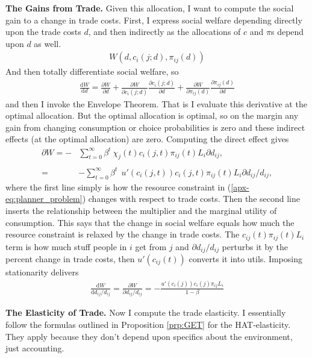 \documentclass[12pt,pdftex]{article}
\begin{document}
\begin{onehalfspacing}
\textbf{The Gains from Trade.} Given this allocation, I want to compute the social gain to a change in trade costs. First, I express social welfare depending directly upon the trade costs $d$, and then indirectly as the allocations of $c$ and $\pi$s depend upon $d$ as well.
\begin{align}
W(d, c_{i}(j; d), \pi_{ij}(d))
\end{align}
And then totally differentiate social welfare, so
\begin{align}
\frac{\mathrm{d} W}{\mathrm{d}d} = \frac{\partial W}{\partial d} + \frac{\partial W}{\partial c_{i}(j;d)}\frac{\partial c_{i}(j;d)}{\partial d} + \frac{\partial W}{\partial \pi_{ij}(d)}\frac{\partial \pi_{ij}(d)}{\partial d}
\end{align}
and then I invoke the Envelope Theorem. That is I evaluate this derivative at the optimal allocation. But the optimal allocation is optimal, so on the margin any gain from changing consumption or choice probabilities is zero and these indirect effects (at the optimal allocation) are zero. Computing the direct effect gives
\begin{align}
\partial W = - & \sum_{t=0}^{\infty} \beta^{t} \ \chi_{j}(t) c_{i}(j,t) \pi_{ij}(t) L_{i} \partial d_{ij}, \\
\nonumber \\
=& - \sum_{t=0}^{\infty} \beta^{t} \  \ u'(c_{i}(j,t)) c_{i}(j,t) \pi_{ij}(t) L_{i} \partial d_{ij} / d_{ij},
\end{align}
where the first line simply is how the resource constraint in (\ref{apx-eq:planner_problem}) changes with respect to trade costs. Then the second line inserts the relationship between the multiplier and the marginal utility of consumption.  This says that the change in social welfare equals how much the resource constraint is relaxed by the change in trade costs. The $c_{ij}(t) \pi_{ij}(t) L_{i}$ term is how much stuff people in $i$ get from $j$ and $\partial d_{ij} / d_{ij}$ perturbs it by the percent change in trade costs, then $u'(c_{ij}(t))$ converts it into utils. Imposing stationarity delivers
\begin{align}
\frac{\mathrm{d} W}{\mathrm{d}d_{ij} / d_{ij}} = \frac{\partial W}{\partial d_{ij} / d_{ij}} = -\frac{ u'(c_{i}(j)) c_{i}(j) \pi_{ij} L_{i}}{1- \beta} \label{apx-eq:gains1}
\end{align}

\textbf{The Elasticity of Trade.} Now I compute the trade elasticity. I essentially follow the formulas outlined in Proposition \ref{prp:GET} for the HAT-elasticity. They apply because they don't depend upon specifics about the environment, just accounting.


\end{onehalfspacing}
\end{document}
